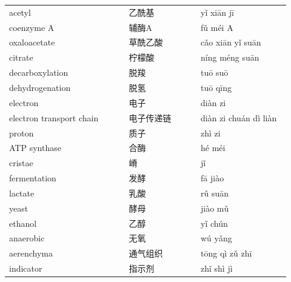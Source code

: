 \documentclass[11pt]{article}
\begin{document}
\begin{longtable}{@{}p{0.40\linewidth}p{0.24\linewidth}p{0.30\linewidth}@{}}
acetyl & 乙酰基 & yǐ xiān jī \\
coenzyme A & 辅酶A & fǔ méi A \\
oxaloacetate & 草酰乙酸 & cǎo xiān yǐ suān \\
citrate & 柠檬酸 & níng méng suān \\
decarboxylation & 脱羧 & tuō suō \\
dehydrogenation & 脱氢 & tuō qīng \\
electron & 电子 & diàn zi \\
electron transport chain & 电子传递链 & diàn zi chuán dì liàn \\
proton & 质子 & zhì zi \\
ATP synthase & 合酶 & hé méi \\
cristae & 嵴 & jǐ \\
fermentation & 发酵 & fā jiào \\
lactate & 乳酸 & rǔ suān \\
yeast & 酵母 & jiào mǔ \\
ethanol & 乙醇 & yǐ chún \\
anaerobic & 无氧 & wú yǎng \\
aerenchyma & 通气组织 & tōng qì zǔ zhī \\
indicator & 指示剂 & zhǐ shì jì \\
\end{longtable}
\end{document}
